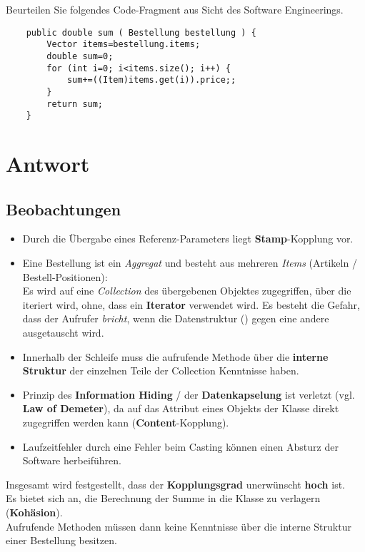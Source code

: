 Beurteilen Sie folgendes Code-Fragment aus Sicht des Software Engineerings.

\begin{verbatim}
    public double sum ( Bestellung bestellung ) {
        Vector items=bestellung.items;
        double sum=0;
        for (int i=0; i<items.size(); i++) {
            sum+=((Item)items.get(i)).price;;
        }
        return sum;
    }
\end{verbatim}

\section*{Antwort}

\subsection*{Beobachtungen}
\begin{itemize}
    \item Durch die Übergabe eines Referenz-Parameters liegt \textbf{Stamp}-Kopplung vor.
    \item Eine Bestellung ist ein \textit{Aggregat} und besteht aus mehreren \textit{Items} (Artikeln / Bestell-Positionen):\\
    Es wird auf eine \textit{Collection} des übergebenen Objektes zugegriffen, über die iteriert wird, ohne, dass ein \textbf{Iterator} verwendet wird.
    Es besteht die Gefahr, dass der Aufrufer \textit{bricht}, wenn die Datenstruktur () gegen eine andere ausgetauscht wird.
    \item Innerhalb der Schleife muss die aufrufende Methode über die \textbf{interne Struktur} der einzelnen Teile der Collection Kenntnisse haben.
    \item Prinzip des \textbf{Information Hiding} / der \textbf{Datenkapselung} ist verletzt (vgl. \textbf{Law of Demeter}), da auf das Attribut  eines Objekts der Klasse  direkt zugegriffen werden kann (\textbf{Content}-Kopplung).
    \item Laufzeitfehler durch eine Fehler beim Casting können einen Absturz der Software herbeiführen.
\end{itemize}

\noindent
Insgesamt wird festgestellt, dass der \textbf{Kopplungsgrad} unerwünscht \textbf{hoch} ist.\\

\noindent
Es bietet sich an, die Berechnung der Summe in die Klasse  zu verlagern (\textbf{Kohäsion}).\\
Aufrufende Methoden müssen dann keine Kenntnisse über die interne Struktur einer Bestellung besitzen.